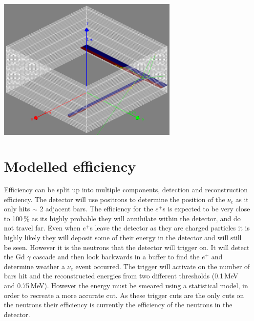 \documentclass[12pt,a4paper]{article}
\newenvironment{Figure}
  {\par\medskip\noindent\minipage{\linewidth}}
  {\endminipage\par\medskip}
\begin{document}
\begin{Figure}
 \centering
 \includegraphics[height=71mm]{full_detector_2730_channels.png}
 \label{2730_chan_det}
\end{Figure}


\section{Modelled efficiency}
Efficiency can be split up into multiple components, detection and reconstruction efficiency. The detector will use positrons to determine the position of the $\overline{\nu_{e}}$ as it only hits $\sim$ 2 adjacent bars. The efficiency for the $e^+$s is expected to be very close to 100\,\% as its highly probable they will annihilate within the detector, and do not travel far. Even when $e^+$s leave the detector as they are charged particles it is highly likely they will deposit some of their energy in the detector and will still be seen. However it is the neutrons that the detector will trigger on. It will detect the Gd $\gamma$ cascade and then look backwards in a buffer to find the $e^+$ and determine weather a $\overline{\nu_e}$ event occurred. The trigger will activate on the number of bars hit and the reconstructed energies from two different thresholds (0.1\,MeV and 0.75\,MeV). However the energy must be smeared using a statistical model, in order to recreate a more accurate cut. As these trigger cuts are the only cuts on the neutrons their efficiency is currently the efficiency of the neutrons in the detector.
\end{document}
